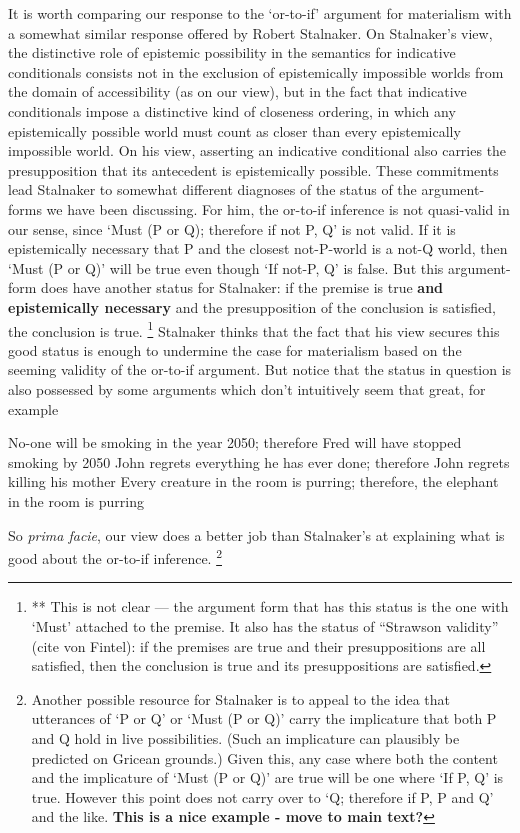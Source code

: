 \documentclass[If.tex]{subfiles}
\begin{document}
It is worth comparing our response to the ‘or-to-if’ argument for materialism with a somewhat similar response offered by Robert Stalnaker. On Stalnaker's view, the distinctive role of epistemic possibility in the semantics for indicative conditionals consists not in the exclusion of epistemically impossible worlds from the domain of accessibility (as on our view), but in the fact that indicative conditionals impose a distinctive kind of closeness ordering, in which any epistemically possible world must count as closer than every epistemically impossible world. On his view, asserting an indicative conditional also carries the presupposition that its antecedent is epistemically possible. These commitments lead Stalnaker to somewhat different diagnoses of the status of the argument-forms we have been discussing. For him, the or-to-if inference is not quasi-valid in our sense, since ‘Must (P or Q); therefore if not P, Q’ is not valid. If it is epistemically necessary that P and the closest not-P-world is a not-Q world, then ‘Must (P or Q)’ will be true even though ‘If not-P, Q’ is false. But this argument-form does have another status for Stalnaker: if the premise is true \textbf{and epistemically necessary} and the presupposition of the conclusion is satisfied, the conclusion is true.%
\footnote{** This is not clear --- the argument form that has this status is the one with ‘Must’ attached to the premise. It also has the status of “Strawson validity” (cite von Fintel): if the premises are true and their presuppositions are all satisfied, then the conclusion is true and its presuppositions are satisfied.}
 Stalnaker thinks that the fact that his view secures this good status is enough to undermine the case for materialism based on the seeming validity of the or-to-if argument. But notice that the status in question is also possessed by some arguments which don't intuitively seem that great, for example
\begin{prop}
	\nitem 
		No-one will be smoking in the year 2050; therefore Fred will have stopped smoking by 2050
	\nitem 
		John regrets everything he has ever done; therefore John regrets killing his mother
	\nitem 
		Every creature in the room is purring; therefore, the elephant in the room is purring
\end{prop}
So \emph{prima facie}, our view does a better job than Stalnaker's at explaining what is good about the or-to-if inference.%
\footnote{Another possible resource for Stalnaker is to appeal to the idea that utterances of ‘P or Q’ or ‘Must (P or Q)’ carry the implicature that both P and Q hold in live possibilities. (Such an implicature can plausibly be predicted on Gricean grounds.) Given this, any case where both the content and the implicature of ‘Must (P or Q)’ are true will be one where ‘If P, Q’ is true. However this point does not carry over to ‘Q; therefore if P, P and Q’ and the like. \textbf{This is a nice example - move to main text?}}
\end{document}
